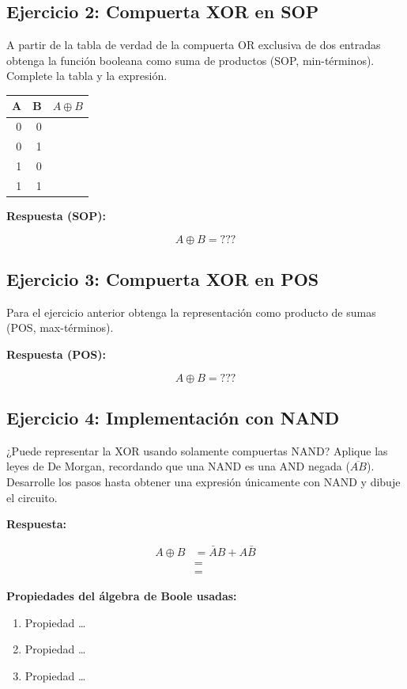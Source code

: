 \documentclass[11pt]{article}
\begin{document}
\subsection{Ejercicio 2: Compuerta XOR en SOP}
\label{sec:org1586db9}
A partir de la tabla de verdad de la compuerta OR exclusiva de dos
entradas obtenga la función booleana como suma de productos (SOP,
min-términos). Complete la tabla y la expresión.

\begin{center}
\begin{tabular}{rrl}
A & B & \(A \oplus B\)\\[0pt]
\hline
0 & 0 & \\[0pt]
0 & 1 & \\[0pt]
1 & 0 & \\[0pt]
1 & 1 & \\[0pt]
\end{tabular}
\end{center}

\textbf{Respuesta (SOP):}

$$A \oplus B = ???$$

\subsection{Ejercicio 3: Compuerta XOR en POS}
\label{sec:org3b4782d}
Para el ejercicio anterior obtenga la representación como producto de
sumas (POS, max-términos).

\textbf{Respuesta (POS):}

$$A \oplus B = ???$$

\subsection{Ejercicio 4: Implementación con NAND}
\label{sec:org9a7de50}
¿Puede representar la XOR usando solamente compuertas NAND? Aplique las
leyes de De Morgan, recordando que una NAND es una AND negada
(\(\overline{AB}\)). Desarrolle los pasos hasta obtener una expresión
únicamente con NAND y dibuje el circuito.

\textbf{Respuesta:}

\begin{align*}
  A \oplus B &= \bar{A}B + A\bar{B} \\
             &= \\
             &=
\end{align*}

\textbf{Propiedades del álgebra de Boole usadas:}
\begin{enumerate}
\item Propiedad \ldots{}
\item Propiedad \ldots{}
\item Propiedad \ldots{}
\end{enumerate}
\end{document}
